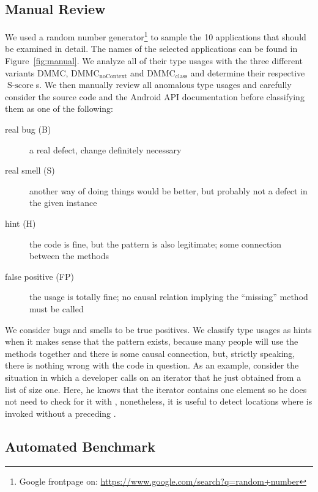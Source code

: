 \subsection{Manual Review}

We used a random number generator\footnote{Google frontpage on: \url{https://www.google.com/search?q=random+number}} to sample the 10 applications that should be examined in detail.
The names of the selected applications can be found in Figure~\ref{fig:manual}.
We analyze all of their type usages with the three different variants $\text{DMMC}$, $\text{DMMC}_{\text{noContext}}$ and $\text{DMMC}_{\text{class}}$ and determine their respective $\operatorname{S-score}$s.
We then manually review all anomalous type usages and carefully consider the source code and the Android API documentation before classifying them as one of the following:
\begin{description}
    \item [real bug (B)] a real defect, change definitely necessary
    \item [real smell (S)] another way of doing things would be better, but probably not a defect in the given instance
    \item [hint (H)] the code is fine, but the pattern is also legitimate; some connection between the methods
    \item [false positive (FP)] the usage is totally fine; no causal relation implying the ``missing'' method must be called
\end{description}

We consider bugs and smells to be true positives.
We classify type usages as hints when it makes sense that the pattern exists, because many people will use the methods together and there is some causal connection, but, strictly speaking, there is nothing wrong with the code in question.
As an example, consider the situation in which a developer calls  on an iterator that he just obtained from a list of size one.
Here, he knows that the iterator contains one element so he does not need to check for it with , nonetheless, it is useful to detect locations where  is invoked without a preceding .

\subsection{Automated Benchmark}

